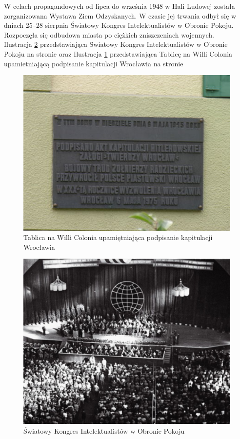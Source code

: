 \documentclass{article}
\begin{document}
W celach propagandowych od lipca do września 1948 w Hali Ludowej została zorganizowana Wystawa Ziem Odzyskanych. W czasie jej trwania odbył się w dniach 25–28 sierpnia Światowy Kongres Intelektualistów w Obronie Pokoju. Rozpoczęła się odbudowa miasta po ciężkich zniszczeniach wojennych.\\
Ilustracja \ref{fig:kongres} przedstawiająca Swiatowy Kongres Intelektualistów w Obronie Pokoju
na stronie \pageref{fig:kongres} oraz Ilustracja \ref{fig:tablica} przedstawiająca  Tablicę  na  Willi  Colonia  upamietniającą  podpisanie  kapitulacji Wrocławia
na stronie \pageref{fig:tablica}
\begin{figure}[h!]
\centering
\includegraphics[scale=2]{450px-Willa_Colonia-tablica.jpg}
\caption{Tablica na Willi Colonia upamiętniająca podpisanie kapitulacji Wrocławia}
\label{fig:tablica}
\end{figure}

\begin{figure}[h!]
\centering
\includegraphics[scale=0.6]{450px-Kongres1.png}
\caption{Światowy Kongres Intelektualistów w Obronie Pokoju}
\label{fig:kongres}
\end{figure}
\end{document}

